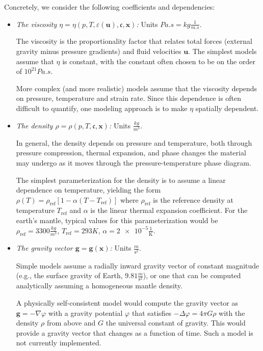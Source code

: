 \documentclass{article}
\begin{document}
Concretely, we consider the following coefficients and dependencies:
\begin{itemize}
\item \textit{The viscosity $\eta=\eta(p,T,\varepsilon(\mathbf u),\mathfrak
c,\mathbf x)$:} Units $\si{Pa . s} =
  \si{kg}\frac{1}{\si{m . s}}$.

  The viscosity is the proportionality factor that relates total forces
  (external gravity minus pressure gradients) and fluid velocities $\mathbf
  u$. The simplest models assume that $\eta$ is constant, with the constant
  often chosen to be on the order of $10^{21} \si{Pa . s}$.

  More complex (and more realistic) models assume that the viscosity depends
  on pressure, temperature and strain rate. Since this dependence is often
  difficult to quantify, one modeling approach is to make $\eta$ spatially
  dependent.

\item \textit{The density $\rho=\rho(p,T,\mathfrak c,\mathbf x)$:} Units
  $\frac{\si{kg}}{\si{m}^3}$.

  In general, the density depends on pressure and temperature, both through
  pressure compression, thermal expansion, and phase changes the material may
  undergo as it moves through the pressure-temperature phase diagram.

  The simplest parameterization for the density is to assume a linear
  dependence on temperature, yielding the form
  $\rho(T)=\rho_{\text{ref}}[1-\alpha (T-T_{\text{ref}})]$ where
  $\rho_{\text{ref}}$ is the reference density at temperature $T_{\text{ref}}$
  and $\alpha$ is the linear thermal expansion coefficient. For the earth's
  mantle, typical values for this parameterization would be
  $\rho_{\text{ref}}=3300\frac{\si{kg}}{\si{m}^3}$,
  $T_{\text{ref}}=293 \si{K}$, $\alpha=\num{2e-5}
  \frac{1}{\mathrm{K}}$.

\item \textit{The gravity vector $\mathbf g=\mathbf g(\mathbf x)$:} Units
  $\frac{\si{m}}{\textrm{s}^2}$.

  Simple models assume a radially inward gravity vector of constant magnitude
  (e.g., the surface gravity of Earth, $9.81 \frac{\si{m}}{\textrm{s}^2}$),
  or one that can be computed analytically assuming a homogeneous mantle
  density.

  A physically self-consistent model would compute the gravity vector as
  $\mathbf g = -\nabla \varphi$ with a gravity potential $\varphi$ that
  satisfies $-\Delta\varphi=4\pi G\rho$ with the density $\rho$ from above and
  $G$ the universal constant of gravity. This would provide a gravity vector
  that changes as a function of time. Such a model is not currently
  implemented.


\end{itemize}
\end{document}
